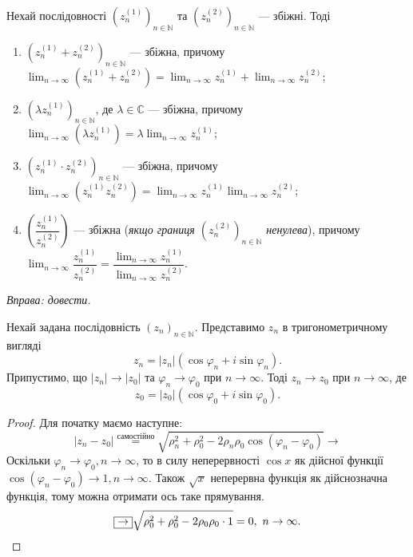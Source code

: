 \documentclass{math_library}
\begin{document}
\begin{proposition}
Нехай послідовності $(z_n^{(1)})_{n \in \mathbb{N}}$ та $(z_n^{(2)})_{n \in \mathbb{N}}$ --- збіжні. Тоді
\begin{enumerate}[nosep,wide=0pt,label=\arabic*)]
\item $(z_n^{(1)}+z_n^{(2)})_{n \in \mathbb{N}}$ --- збіжна, причому $\displaystyle\lim_{n \to \infty} (z_n^{(1)} + z_n^{(2)}) = \lim_{n \to \infty} z_n^{(1)} + \lim_{n \to \infty} z_n^{(2)}$;
\item $(\lambda z_n^{(1)})_{n \in \mathbb{N}}$, де $\lambda \in \mathbb{C}$ --- збіжна, причому $\displaystyle\lim_{n \to \infty} (\lambda z_n^{(1)}) = \lambda \lim_{n \to \infty} z_n^{(1)}$;
\item $(z_n^{(1)} \cdot z_n^{(2)})_{n \in \mathbb{N}}$ --- збіжна, причому $\displaystyle\lim_{n \to \infty} (z_n^{(1)} z_n^{(2)}) = \lim_{n \to \infty} z_n^{(1)} \lim_{n \to \infty} z_n^{(2)}$;
\item $\left( \dfrac{z_n^{(1)}}{z_n^{(2)}} \right)$ --- збіжна (\textit{якщо границя $(z_n^{(2)})_{n \in \mathbb{N}}$ ненулева}), причому $\displaystyle\lim_{n \to \infty} \dfrac{z_n^{(1)}}{z_n^{(2)}} = \dfrac{\displaystyle\lim_{n \to \infty} z_n^{(1)}}{\displaystyle\lim_{n \to \infty} z_n^{(2)}}$.
\end{enumerate}
\textit{Вправа: довести.}
\end{proposition}

\begin{proposition}
Нехай задана послідовність $(z_n)_{n \in \mathbb{N}}$. Представимо $z_n$ в тригонометричному вигляді 
\[
z_n = |z_n| ( \cos \varphi_n + i \sin \varphi_n).
\]
Припустимо, що $|z_n| \to |z_0|$ та $\varphi_n \to \varphi_0$ при $n \to \infty$. Тоді $z_n \to z_0$ при $n \to \infty$, де
\[ 
z_0 = |z_0| ( \cos \varphi_0 + i \sin \varphi_0).
\]
\end{proposition}

\begin{proof}
Для початку маємо наступне:
\[
|z_n - z_0| \overset{\text{самостійно}}{=} \sqrt{\rho_n^2 + \rho_0^2 - 2 \rho_n \rho_0 \cos (\varphi_n-\varphi_0)} \boxed{\to}
\]
Оскільки $\varphi_n \to \varphi_0, n \to \infty$, то в силу неперервності $\cos x$ як дійсної функції $\cos (\varphi_n - \varphi_0) \to 1, n \to \infty$. Також $\sqrt{x}$ неперервна функція як дійснозначна функція, тому можна отримати ось таке прямування.
\[
\boxed{\to} \sqrt{\rho_0^2 + \rho_0^2 - 2 \rho_0 \rho_0 \cdot 1} = 0,\ n \to \infty. \qedhere
\]
\end{proof}
\end{document}
